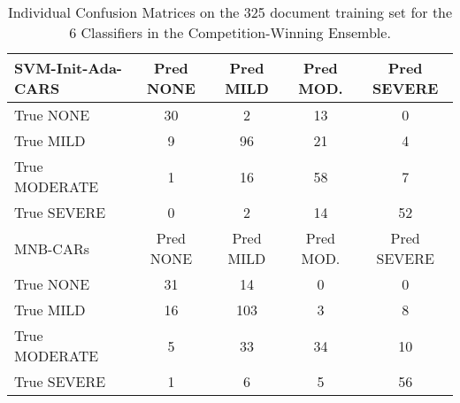 {\begin{table}[]
\begin{tabular}{|l|c|c|c|c|}
   \hline
   \cellcolor{gray!15} \textsf{SVM-Init-Ada-CARS} & \textsf{Pred NONE} & \textsf{Pred MILD} & \textsf{Pred MOD.} & \textsf{Pred SEVERE} \\
   \hline
   \textsf{True NONE} & \cellcolor{gray!15} 30 & 2 & 13 & 0 \\
   \textsf{True MILD} & 9 & \cellcolor{gray!15} 96 & 21 & 4 \\
   \textsf{True MODERATE} & 1 & 16 & \cellcolor{gray!15} 58 & 7 \\
   \textsf{True SEVERE} & 0 & 2 & 14 & \cellcolor{gray!15} 52 \\
   \hline
   \cellcolor{gray!15} \textsf{MNB-CARs} & \textsf{Pred NONE} & \textsf{Pred MILD} & \textsf{Pred MOD.} & \textsf{Pred SEVERE} \\
   \hline
   \textsf{True NONE} & \cellcolor{gray!15} 31 & 14 & 0 & 0 \\
   \textsf{True MILD} & 16 & \cellcolor{gray!15} 103 & 3 & 8 \\
   \textsf{True MODERATE} & 5 & 33 & \cellcolor{gray!15} 34 & 10 \\
   \textsf{True SEVERE} & 1 & 6 & 5 & \cellcolor{gray!15} 56 \\
    \hline
    \end{tabular}
    \caption{Individual Confusion Matrices on the 325 document training set for the 6 Classifiers in the Competition-Winning Ensemble.}
    \label{tab:BestEnsembleClassifiersConfusionMatrix}
\end{table}} \quad


